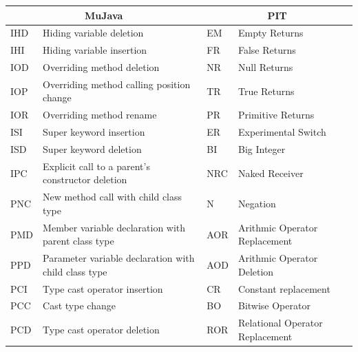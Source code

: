 \documentclass[conference,draftclsnofoot,onecolumn]{IEEEtran}
\begin{document}
\begin{table}[ht]
\centering
\begin{tabular}{|l|l|l|l|}
\hline
\multicolumn{2}{|c|}{\textbf{MuJava}}                           & \multicolumn{2}{|c|}{\textbf{PIT}}                      \\ \hline
IHD & Hiding variable deletion                                  & EM                    & Empty Returns                   \\ \hline
IHI & Hiding variable   insertion                               & FR                    & False Returns                   \\ \hline
IOD & Overriding method   deletion                              & NR                    & Null Returns                    \\ \hline
IOP & Overriding method   calling position change               & TR                    & True Returns                    \\ \hline
IOR & Overriding method   rename                                & PR                    & Primitive Returns               \\ \hline
ISI & Super keyword insertion                                   & ER                    & Experimental Switch             \\ \hline
ISD & Super keyword deletion                                    & BI                    & Big Integer                     \\ \hline
IPC & Explicit call to a   parent’s constructor deletion        & NRC                   & Naked Receiver                  \\ \hline
PNC & New method call with   child class type                   & N                     & Negation                        \\ \hline
PMD & Member variable   declaration with parent class type      & AOR                   & Arithmic Operator Replacement   \\ \hline
PPD & Parameter variable   declaration with child class type    & AOD                   & Arithmic Operator Deletion      \\ \hline
PCI & Type cast operator   insertion                            & CR                    & Constant replacement            \\ \hline
PCC & Cast type change                                          & BO                    & Bitwise Operator                \\ \hline
PCD & Type cast operator   deletion                             & ROR                   & Relational Operator Replacement \\ \hline

\end{tabular}
\end{table}
\end{document}
